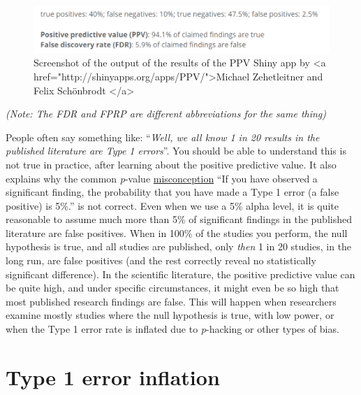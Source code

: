 \documentclass[
  oneside]{book}
\begin{document}
\begin{figure}

{\centering \includegraphics[width=1\linewidth]{images/PPVexample} 

}

\caption{Screenshot of the output of the results of the PPV Shiny app by <a href="http://shinyapps.org/apps/PPV/">Michael Zehetleitner and Felix Schönbrodt </a>}\label{fig:ppvexample}
\end{figure}

\emph{(Note: The FDR and FPRP are different abbreviations for the same thing)}

People often say something like: ``\emph{Well, we all know 1 in 20 results in the published literature are Type 1 errors}''. You should be able to understand this is not true in practice, after learning about the positive predictive value. It also explains why the common \emph{p}-value \protect\hyperlink{misconception4}{misconception} ``If you have observed a significant finding, the probability that you have made a Type 1 error (a false positive) is 5\%.'' is not correct. Even when we use a 5\% alpha level, it is quite reasonable to assume much more than 5\% of significant findings in the published literature are false positives. When in 100\% of the studies you perform, the null hypothesis is true, and all studies are published, only \emph{then} 1 in 20 studies, in the long run, are false positives (and the rest correctly reveal no statistically significant difference). In the scientific literature, the positive predictive value can be quite high, and under specific circumstances, it might even be so high that most published research findings are false. This will happen when researchers examine mostly studies where the null hypothesis is true, with low power, or when the Type 1 error rate is inflated due to \emph{p}-hacking or other types of bias.

\hypertarget{type-1-error-inflation}{%
\section{Type 1 error inflation}\label{type-1-error-inflation}}
\end{document}
